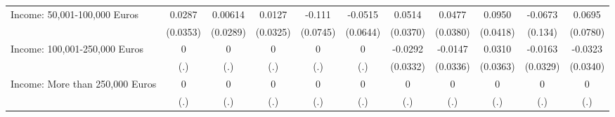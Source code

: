 {\begin{tabular}{l*{10}{c}}
Income: 50,001-100,000 Euros&      0.0287         &     0.00614         &      0.0127         &      -0.111         &     -0.0515         &      0.0514         &      0.0477         &      0.0950\sym{*}  &     -0.0673         &      0.0695         \\
            &    (0.0353)         &    (0.0289)         &    (0.0325)         &    (0.0745)         &    (0.0644)         &    (0.0370)         &    (0.0380)         &    (0.0418)         &     (0.134)         &    (0.0780)         \\
\addlinespace
Income: 100,001-250,000 Euros&           0         &           0         &           0         &           0         &           0         &     -0.0292         &     -0.0147         &      0.0310         &     -0.0163         &     -0.0323         \\
            &         (.)         &         (.)         &         (.)         &         (.)         &         (.)         &    (0.0332)         &    (0.0336)         &    (0.0363)         &    (0.0329)         &    (0.0340)         \\
\addlinespace
Income: More than 250,000 Euros&           0         &           0         &           0         &           0         &           0         &           0         &           0         &           0         &           0         &           0         \\
            &         (.)         &         (.)         &         (.)         &         (.)         &         (.)         &         (.)         &         (.)         &         (.)         &         (.)         &         (.)         \\
\bottomrule
\end{tabular}
}
